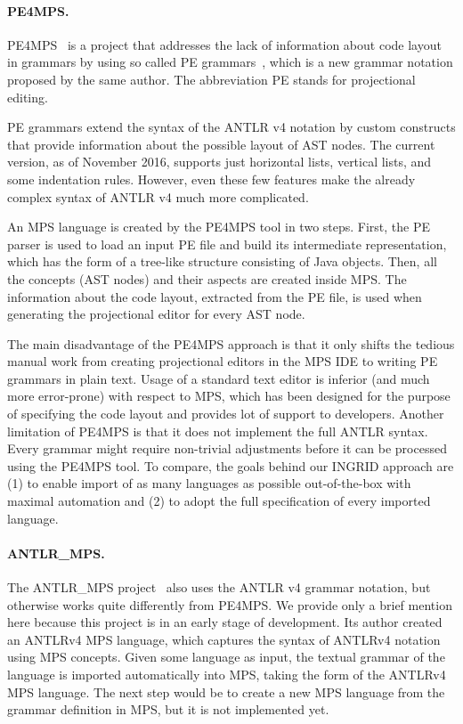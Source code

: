 \paragraph{PE4MPS.}
PE4MPS~\cite{ref:PE4MPS} is a project that addresses the lack of information about code layout in grammars by using so called PE grammars~\cite{ref:PE}, which is a new grammar notation proposed by the same author.
The abbreviation PE stands for projectional editing.

PE grammars extend the syntax of the ANTLR v4 notation by custom constructs that provide information about the possible layout of AST nodes.
The current version, as of November 2016, supports just horizontal lists, vertical lists, and some indentation rules.
However, even these few features make the already complex syntax of ANTLR v4 much more complicated.

An MPS language is created by the PE4MPS tool in two steps.
First, the PE parser is used to load an input PE file and build its intermediate representation, which has the form of a tree-like structure consisting of Java objects.
Then, all the concepts (AST nodes) and their aspects are created inside MPS.
The information about the code layout, extracted from the PE file, is used when generating the projectional editor for every AST node.

The main disadvantage of the PE4MPS approach is that it only shifts the tedious manual work from creating projectional editors in the MPS IDE to writing PE grammars in plain text.
Usage of a standard text editor is inferior (and much more error-prone) with respect to MPS, which has been designed for the purpose of specifying the code layout and provides lot of support to developers.
Another limitation of PE4MPS is that it does not implement the full ANTLR syntax.
Every grammar might require non-trivial adjustments before it can be processed using the PE4MPS tool.
To compare, the goals behind our INGRID approach are (1) to enable import of as many languages as possible out-of-the-box with maximal automation and (2) to adopt the full specification of every imported language.

\paragraph{ANTLR{\_}MPS.}
The ANTLR{\_}MPS project~\cite{ref:ANTLR2MPS} also uses the ANTLR v4 grammar notation, but otherwise works quite differently from PE4MPS.
We provide only a brief mention here because this project is in an early stage of development.
Its author created an ANTLRv4 MPS language, which captures the syntax of ANTLRv4 notation using MPS concepts.
Given some language as input, the textual grammar of the language is imported automatically into MPS, taking the form of the ANTLRv4 MPS language.
The next step would be to create a new MPS language from the grammar definition in MPS, but it is not implemented yet.

